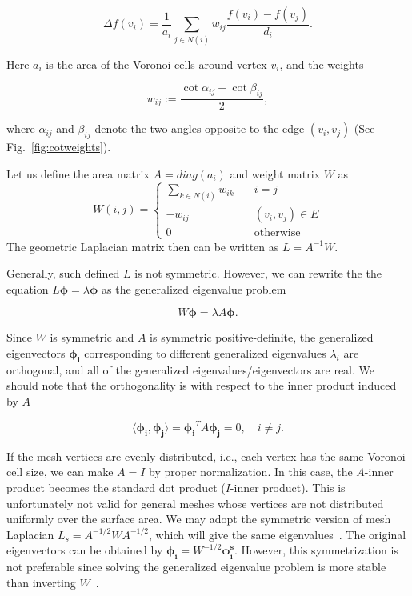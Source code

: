 \begin{equation}
\Delta f(v_i)=\frac{1}{a_i}\sum_{j\in N(i)}w_{ij}\frac{f(v_i)-f(v_j)}{d_i}.
\end{equation}

Here $a_i$ is the area of the Voronoi cells around vertex $v_i$, and the weights

\begin{equation}
w_{ij}:=\frac{\cot\alpha_{ij}+\cot\beta_{ij}}{2},
\end{equation}

where $\alpha_{ij}$ and $\beta_{ij}$ denote the two angles opposite to the edge $(v_i,v_j)$
(See Fig.~\ref{fig:cotweights}).

Let us define the area matrix $A=diag(a_i)$ and weight matrix $W$ as
\begin{equation*}
W(i,j)=\left\{
       \begin{array}{lc}
        \sum_{k\in N(i)}w_{ik}\quad & i=j \\
        -w_{ij}\quad & (v_i,v_j)\in E \\
        0\quad & \text{otherwise}
    \end{array}
\right.
\end{equation*}
The geometric Laplacian matrix then can be written as $L=A^{-1}W$.

Generally, such defined $L$ is not symmetric. However, we can rewrite the the
equation $L\mathbf{\phi}=\lambda\mathbf{\phi}$ as the generalized eigenvalue
problem

\begin{equation}
\label{eq:geneigen}
W\mathbf{\phi}=\lambda A\mathbf{\phi}.
\end{equation}

Since $W$ is symmetric and $A$ is symmetric positive-definite, the generalized
eigenvectors $\mathbf{\phi_i}$ corresponding to different generalized eigenvalues
$\lambda_i$ are orthogonal, and all of the generalized eigenvalues/eigenvectors
are real. We should note that the orthogonality is with respect to the inner product
induced by $A$

\begin{equation}
\langle\mathbf{\phi_i},\mathbf{\phi_j}\rangle=\mathbf{\phi_i}^T A \mathbf{\phi_j}=0,\quad i\neq j.
\end{equation}

If the mesh vertices are evenly distributed, i.e., each vertex has the same Voronoi
cell size, we can make $A=I$ by proper normalization. In this case, the $A$-inner
product becomes the standard dot product ($I$-inner product). This is unfortunately
not valid for general meshes whose vertices are not distributed uniformly over the
surface area. We may adopt the symmetric version of mesh Laplacian $L_s = A^{-1/2}WA^{-1/2}$,
which will give the same eigenvalues~\cite{Vallet2008}. The original eigenvectors can be
obtained by $\mathbf{\phi_i}=W^{-1/2}\mathbf{\phi^s_i}$. However, this symmetrization is not
preferable since solving the generalized eigenvalue problem is more stable than
inverting $W$~\cite{Reuter:CG:2009}.

